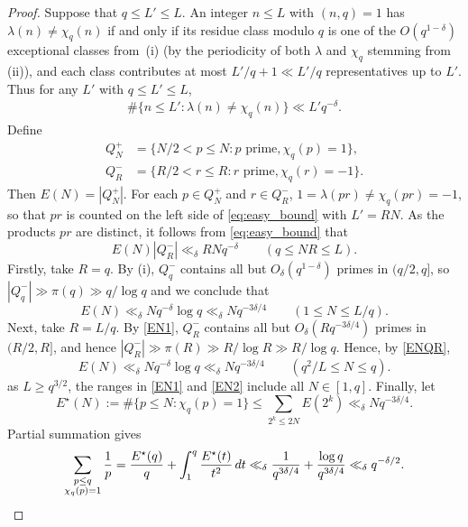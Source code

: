 \documentclass[11pt]{amsart}
\begin{document}
\begin{proof}
%
Suppose that $q \leq L' \leq L$.
An integer $n \leq L$ with $(n,q) = 1$ has
$\lambda(n) \neq \chi_q(n)$ if and only if its residue
class modulo $q$ is one of the $O(q^{1-\delta})$
exceptional classes from~(i)
(by the periodicity of both $\lambda$ and $\chi_q$ stemming from (ii)),
and each class contributes at most $L'/q + 1 \ll L' / q$
representatives up to $L'$. Thus for any $L'$ with $q \leq L' \leq L$, 
\begin{align} \label{eq:easy_bound} 
\# \{ n \leq L' : \lambda(n) \neq \chi_q(n) \} \ll L' q^{-\delta}.
\end{align}
Define
\begin{align*}
Q^+_N &= \{ N/2<p\le N : p\text{ prime},  \chi_q(p)=1 \}, \\
Q^-_R &= \{ R/2<r\le R : r\text{ prime}, \chi_q(r)=-1 \}.
\end{align*}
Then $E(N) = |Q^+_N|$.
For each $p\in Q^+_N$ and $r\in Q^-_R$, $1=\lambda(pr)\ne \chi_q(pr)=-1$,
so that $pr$ is counted on the left side of \eqref{eq:easy_bound} with $L'=RN$.
As the products $pr$ are distinct,
it follows from \eqref{eq:easy_bound} that
\begin{equation}\label{ENQR}
E(N) |Q^-_R| \ll_\delta RN q^{-\delta} \qquad (q\le NR \le L).
\end{equation}
Firstly, take $R=q$. By (i), $Q^-_q$ contains all but $O_\delta(q^{1-\delta})$ primes in $(q/2,q]$, so $|Q^-_q| \gg \pi(q)\gg q/\log q$ and we conclude that 
\begin{equation}\label{EN1}
E(N)\ll_\delta N q^{-\delta}\log q \ll_\delta N q^{-3\delta/4} \qquad (1\le N\le L/q).
\end{equation}
Next, take $R=L/q$.  By \eqref{EN1}, $Q_R^{-}$ contains all but $O_\delta(R q^{-3\delta/4})$
primes in $(R/2,R]$, and hence $|Q_R^{-}| \gg \pi(R) \gg R/\log R \gg R/\log q$.
Hence, by \eqref{ENQR},
\begin{equation}\label{EN2}
E(N)\ll_\delta N q^{-\delta}\log q \ll_\delta N q^{-3\delta/4} \qquad (q^2/L \le N\le q).
\end{equation}
as $L\ge q^{3/2}$, the ranges in \eqref{EN1} and \eqref{EN2} include all $N\in [1,q]$.
 Finally, let 
$$
E^{\star}(N) := \#\{ p \leq N : \chi_q(p) = 1  \} \leq \sum_{2^k \leq 2 N} E(2^k) \ll_\delta N q^{-3 \delta/ 4}.
$$
Partial summation gives
\[
\sum_{\substack{p \leq q \\ \chi_q(p) = 1}}
\frac{1}{p}
= \frac{E^{\star}(q)}{q}
+ \int_1^q \frac{E^{\star}(t)}{t^2}\, dt \ll_\delta
\frac{1}{q^{3\delta/4}}+\frac{\log q}{q^{3\delta/4}} \ll_\delta q^{-\delta/2}.\qedhere
\]
\end{proof}
\end{document}
